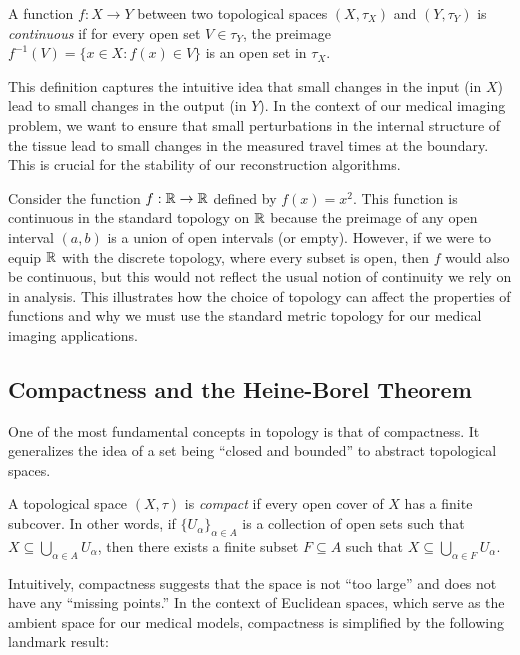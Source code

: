 \begin{definition}
  A function $f: X \to Y$ between two topological spaces $(X, \tau_X)$ and $(Y, \tau_Y)$ is \emph{continuous} if for every open set $V \in \tau_Y$, the preimage $f^{-1}(V) = \{x \in X : f(x) \in V\}$ is an open set in $\tau_X$.
\end{definition}

This definition captures the intuitive idea that small changes in the input (in $X$) lead to small changes in the output (in $Y$). In the context of our medical imaging problem, we want to ensure that small perturbations in the internal structure of the tissue lead to small changes in the measured travel times at the boundary. This is crucial for the stability of our reconstruction algorithms.

\begin{example}
  Consider the function $f: \mathbb{R} \rightarrow \mathbb{R}$ defined by $f(x) = x^2$. This function is continuous in the standard topology on $\mathbb{R}$ because the preimage of any open interval $(a, b)$ is a union of open intervals (or empty). However, if we were to equip $\mathbb{R}$ with the discrete topology, where every subset is open, then $f$ would also be continuous, but this would not reflect the usual notion of continuity we rely on in analysis. This illustrates how the choice of topology can affect the properties of functions and why we must use the standard metric topology for our medical imaging applications.
\end{example}

\subsection{Compactness and the Heine-Borel Theorem} One of the most fundamental concepts in topology is that of compactness. It generalizes the idea of a set being ``closed and bounded'' to abstract topological spaces.

\begin{definition}
  A topological space $(X, \tau)$ is \emph{compact} if every open cover of $X$ has a finite subcover. In other words, if $\{U_\alpha\}_{\alpha \in A}$ is a collection of open sets such that $X \subseteq \bigcup_{\alpha \in A} U_\alpha$, then there exists a finite subset $F \subseteq A$ such that $X \subseteq \bigcup_{\alpha \in F} U_\alpha$.
\end{definition}

Intuitively, compactness suggests that the space is not ``too large'' and does not have any ``missing points.'' In the context of Euclidean spaces, which serve as the ambient space for our medical models, compactness is simplified by the following landmark result:

